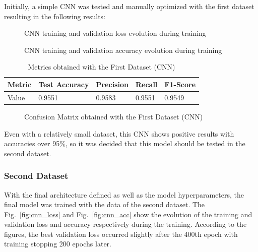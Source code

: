 Initially, a simple CNN was tested and manually optimized with the first dataset resulting in the following results:

\begin{figure}[H]
    \centering
    {\fontsize{10}{12}\selectfont}
    \caption[CNN training and validation loss evolution during training]{CNN training and validation loss evolution during training}
    \label{fig:cnn_dataset1_loss}
\end{figure}

\begin{figure}[H]
    \centering
    {\fontsize{10}{12}\selectfont}
    \caption[CNN training and validation accuracy evolution during training]{CNN training and validation accuracy evolution during training}
    \label{fig:cnn_dataset1_acc}
\end{figure}

\begin{table}[H]
    \centering
    \caption{Metrics obtained with the First Dataset (CNN)}
    \label{table:cnn_dataset1_results}
    \begin{tabular}{|l|l|l|l|l|}
        \hline
        Metric & Test Accuracy & Precision & Recall & F1-Score \\
        \hline
        Value & 0.9551 & 0.9583 & 0.9551 & 0.9549 \\
        \hline
    \end{tabular}
\end{table}

\begin{figure}[H]
    \centering
    {\fontsize{10}{12}\selectfont}
    \caption[Confusion Matrix obtained with the First Dataset (CNN)]{Confusion Matrix obtained with the First Dataset (CNN)}
    \label{fig:cnn_dataset1_conf_matrix}
\end{figure}

Even with a relatively small dataset, this CNN shows positive results with accuracies over 95\%, so it was decided that this model should be tested in the second dataset.

\subsubsection{Second Dataset}

With the final architecture defined as well as the model hyperparameters, the final model was trained with the data of the second dataset. The Fig.~\ref{fig:cnn_loss} and Fig.~\ref{fig:cnn_acc} show the evolution of the training and validation loss and accuracy respectively during the training. According to the figures, the best validation loss occurred slightly after the 400th epoch with training stopping 200 epochs later.

